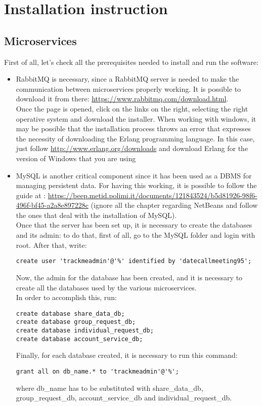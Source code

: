 \section{Installation instruction}
\subsection{Microservices}
First of all, let's check all the prerequisites needed to install and run the software:

\begin{itemize}

\item RabbitMQ is necessary, since a RabbitMQ server is needed to make the communication between microservices properly working.
It is possible to download it from there: \url{https://www.rabbitmq.com/download.html}. \\
Once the page is opened, click on the links on the right, selecting the right operative system and download the installer. 
When working with windows, it may be possible that the installation process throws an error that expresses the necessity of downloading
the Erlang programming language. In this case, just follow \url{http://www.erlang.org/downloads} and download Erlang for the version
of Windows that you are using

\item MySQL is another critical component since it has been used as a DBMS for managing persistent data. For having this working, it
is possible to follow the guide at : \url{https://beep.metid.polimi.it/documents/121843524/b5d81926-98f6-496f-bf45-a2a8e897228c} 
(ignore all the chapter regarding NetBeans and follow the ones that deal with the installation of MySQL). \\
Once that the server has been set up, it is necessary to create the databases and its admin: to do that, first of all, go to the MySQL 
folder and login with root. After that, write:
 \begin{verbatim}
create user 'trackmeadmin'@'%' identified by 'datecallmeeting95';
\end{verbatim}
Now, the admin for the database has been created, and it is necessary to create all the databases used by the various microservices. \\
In order to accomplish this, run:
\begin{verbatim}
create database share_data_db;
create database group_request_db; 
create database individual_request_db;
create database account_service_db;
\end{verbatim}
Finally, for each database created, it is necessary to run this command: 
\begin{verbatim}
grant all on db_name.* to 'trackmeadmin'@'%';
\end{verbatim}
where db\_name has to be substituted with share\_data\_db, group\_request\_db, account\_service\_db and individual\_request\_db. 

\end{itemize}

